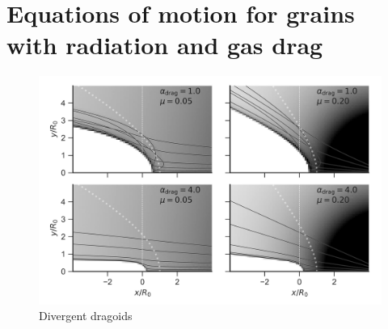 \section{Equations of motion for grains with radiation and gas drag}
\label{sec:equat-moti-grains}

\begin{figure}
  \includegraphics[width=\linewidth]{figs/dust-couple-div-stream}
  \caption{Divergent dragoids}
  \label{fig:divergent-dragoids}
\end{figure}

